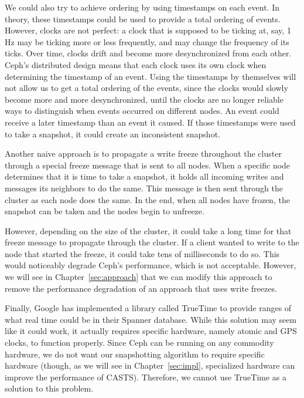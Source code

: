 We could also try to achieve ordering by using timestamps on each event. In theory,
these timestamps could be used to provide a total ordering of events. However,
clocks are not perfect: a clock that is supposed to be ticking at, say, 1 Hz 
may be ticking more or less frequently, and may change the frequency of its 
ticks. Over time, clocks drift and become more
desynchronized from each other. Ceph's distributed design means that
each clock uses its own clock when determining the timestamp of an
event. Using the timestamps by themselves will not allow us to get a
total ordering of the events, since the clocks would slowly become
more and more desynchronized, until the clocks are no longer reliable
ways to distinguish when events occurred on different nodes. An event
could receive a later timestamp than an event it caused. If those timestamps 
were used to take a snapshot, it could create an inconsistent snapshot.

Another naive approach is to propagate a write freeze throughout the
cluster through a special freeze message that is sent to all nodes.  When a specific node determines that it is time to take a
snapshot, it holds all incoming writes and messages its neighbors to
do the same. This message is then sent through the cluster as each node
does the same. In the end, when all nodes have frozen, the snapshot
can be taken and the nodes begin to unfreeze.

However, depending on the size of the cluster, it could take a long
time for that freeze message to propagate through the cluster. If a client
wanted to write to the node that started the freeze, it could take
tens of milliseconds to do so.  This would noticeably degrade Ceph's
performance, which is not acceptable.  However, we will see in
Chapter~\ref{sec:approach} that we can modify this approach to remove
the performance degradation of an approach that uses write freezes.

Finally, Google has implemented a library called TrueTime to provide
ranges of what real time could be in their Spanner database. While
this solution may seem like it could work, it actually requires
specific hardware, namely atomic and GPS clocks, to function
properly. Since Ceph can be running on any commodity hardware, we do
not want our snapshotting algorithm to require specific hardware (though, as we will
see in Chapter~\ref{sec:impl}, specialized hardware can improve the
performance of CASTS). Therefore, we cannot use TrueTime as a
solution to this problem. 















